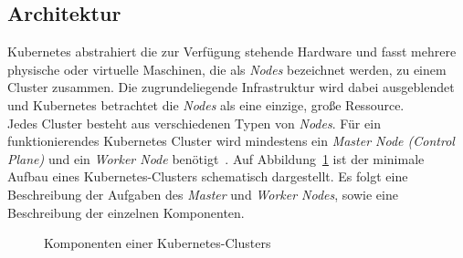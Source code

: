 \subsection{Architektur}

Kubernetes abstrahiert die zur Verfügung stehende Hardware und fasst mehrere physische oder virtuelle Maschinen,
die als \textit{Nodes} bezeichnet werden, zu einem Cluster zusammen.
Die zugrundeliegende Infrastruktur wird dabei ausgeblendet und Kubernetes betrachtet die \textit{Nodes} als eine einzige, große Ressource.
\\
Jedes Cluster besteht aus verschiedenen Typen von \textit{Nodes}.
Für ein funktionierendes Kubernetes Cluster wird mindestens ein \textit{Master Node (Control Plane)} und ein \textit{Worker Node} benötigt~\cite{kubernetes-in-action-introduction}.
Auf Abbildung~\ref{fig:kubernetes-architecture} ist der minimale Aufbau eines Kubernetes-Clusters schematisch dargestellt. Es folgt eine
Beschreibung der Aufgaben des \textit{Master} und \textit{Worker Nodes}, sowie eine Beschreibung der einzelnen Komponenten.

\begin{figure}[htp] %
      \centering
      \caption{Komponenten einer Kubernetes-Clusters}
      \label{fig:kubernetes-architecture}
\end{figure}

